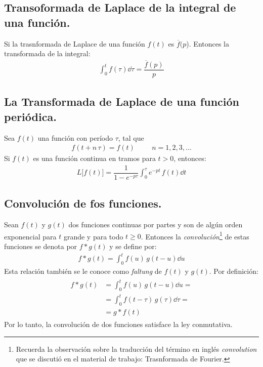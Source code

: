 \subsection{Transoformada de Laplace de la integral de una función.}

Si la trasnformada de Laplace de una función $f(t)$ es $\overline{f}(p$). Entonces la transformada de la integral:
\begin{align}
\int_{0}^{t} f(\tau) \dd{\tau} = \dfrac{\overline{f}(p)}{p}
\label{eq:ecuacion_03_16}
\end{align}

\subsection{La Transformada de Laplace de una función periódica.}

Sea $f(t)$ una función con período $\tau$, tal que 
\begin{align*}
f(t + n \, \tau) = f(t) \hspace{1cm} n = 1, 2, 3, \ldots
\end{align*}
Si $f(t)$ es una función continua en tramos para $t > 0$, entonces:
\begin{align}
L \big[f(t)\big] = \dfrac{1}{1 - e^{-p \tau}} \int_{0}^{\tau} e^{-p t} \, f(t) \dd{t}
\end{align}

\subsection{Convolución de fos funciones.}

Sean $f (t)$ y $g (t)$ dos funciones continuas por partes y son de algún orden exponencial para $t$ grande y para todo $t \geq 0$. Entonces la \emph{convolución}\footnote{Recuerda la observación sobre la traducción del término en inglés \emph{convolution} que se discutió en el material de trabajo: Trasnformada de Fourier.} de estas funciones se denota por $f * g (t)$ y se define por:
\begin{align}
f * g(t) = \int_{0}^{t} f(u) \, g(t - u) \dd{u}
\label{03_55}
\end{align}
Esta relación también se le conoce como \emph{faltung} de $f(t)$ y $g(t)$. Por definición:
\begin{align}
\begin{aligned}
f * g(t) &= \int_{0}^{t} f(u) \, g(t - u) \dd{u} = \\[0.5em]
&= \int_{0}^{t} f(t - \tau) \, g(\tau) \dd{\tau} = \\[0.5em]
&= g * f(t)
\end{aligned}
\label{eq:ecuacion_03_56}
\end{align}
Por lo tanto, la convolución de dos funciones satisface la ley conmutativa.

